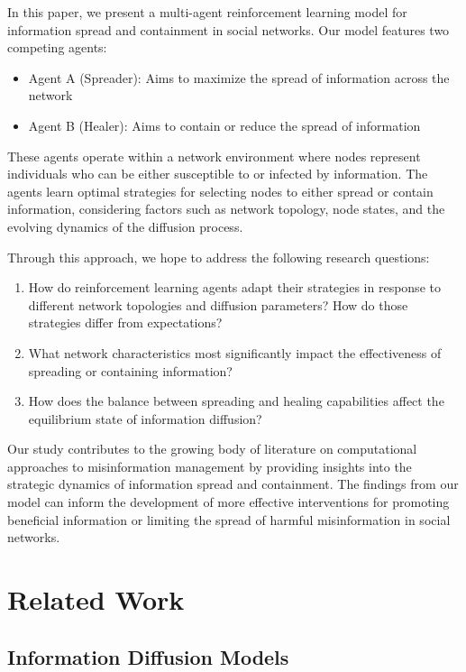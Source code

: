 \documentclass[12pt]{article}
\begin{document}
In this paper, we present a multi-agent reinforcement learning model for information spread and containment in social networks. Our model features two competing agents:

\begin{itemize}
    \item Agent A (Spreader): Aims to maximize the spread of information across the network
    \item Agent B (Healer): Aims to contain or reduce the spread of information
\end{itemize}

These agents operate within a network environment where nodes represent individuals who can be either susceptible to or infected by information. The agents learn optimal strategies for selecting nodes to either spread or contain information, considering factors such as network topology, node states, and the evolving dynamics of the diffusion process.

Through this approach, we hope to address the following research questions:

\begin{enumerate}
    \item How do reinforcement learning agents adapt their strategies in response to different network topologies and diffusion parameters? How do those strategies differ from expectations? 
    \item What network characteristics most significantly impact the effectiveness of spreading or containing information?
    \item How does the balance between spreading and healing capabilities affect the equilibrium state of information diffusion?
\end{enumerate}

Our study contributes to the growing body of literature on computational approaches to misinformation management by providing insights into the strategic dynamics of information spread and containment. The findings from our model can inform the development of more effective interventions for promoting beneficial information or limiting the spread of harmful misinformation in social networks.

\section{Related Work}

\subsection{Information Diffusion Models}
\end{document}
